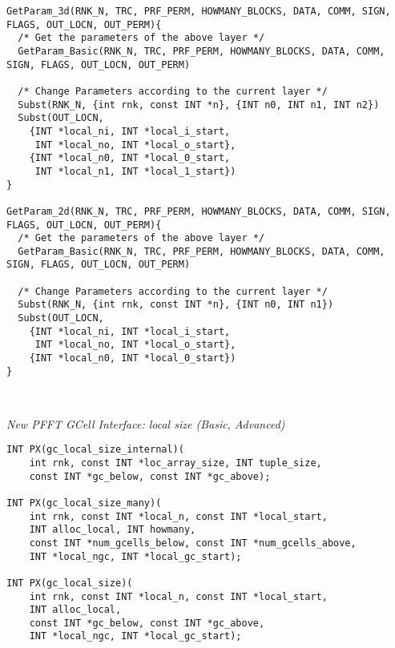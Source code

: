 \begin{lstlisting}
GetParam_3d(RNK_N, TRC, PRF_PERM, HOWMANY_BLOCKS, DATA, COMM, SIGN, FLAGS, OUT_LOCN, OUT_PERM){
  /* Get the parameters of the above layer */
  GetParam_Basic(RNK_N, TRC, PRF_PERM, HOWMANY_BLOCKS, DATA, COMM, SIGN, FLAGS, OUT_LOCN, OUT_PERM)

  /* Change Parameters according to the current layer */
  Subst(RNK_N, {int rnk, const INT *n}, {INT n0, INT n1, INT n2})
  Subst(OUT_LOCN,
    {INT *local_ni, INT *local_i_start,
     INT *local_no, INT *local_o_start},
    {INT *local_n0, INT *local_0_start,
     INT *local_n1, INT *local_1_start})
}

GetParam_2d(RNK_N, TRC, PRF_PERM, HOWMANY_BLOCKS, DATA, COMM, SIGN, FLAGS, OUT_LOCN, OUT_PERM){
  /* Get the parameters of the above layer */
  GetParam_Basic(RNK_N, TRC, PRF_PERM, HOWMANY_BLOCKS, DATA, COMM, SIGN, FLAGS, OUT_LOCN, OUT_PERM)

  /* Change Parameters according to the current layer */
  Subst(RNK_N, {int rnk, const INT *n}, {INT n0, INT n1})
  Subst(OUT_LOCN,
    {INT *local_ni, INT *local_i_start,
     INT *local_no, INT *local_o_start},
    {INT *local_n0, INT *local_0_start})
}



\end{lstlisting}


\newpage
\emph{New PFFT GCell Interface: local size (Basic, Advanced)}
\begin{lstlisting}
INT PX(gc_local_size_internal)(
    int rnk, const INT *loc_array_size, INT tuple_size,
    const INT *gc_below, const INT *gc_above);

INT PX(gc_local_size_many)(
    int rnk, const INT *local_n, const INT *local_start,
    INT alloc_local, INT howmany,
    const INT *num_gcells_below, const INT *num_gcells_above,
    INT *local_ngc, INT *local_gc_start);

INT PX(gc_local_size)(
    int rnk, const INT *local_n, const INT *local_start,
    INT alloc_local,
    const INT *gc_below, const INT *gc_above,
    INT *local_ngc, INT *local_gc_start);
\end{lstlisting}


